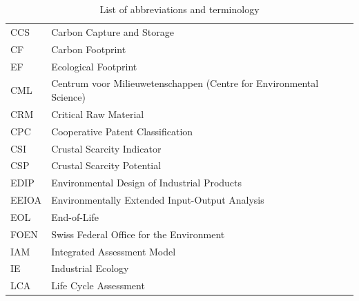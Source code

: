 \documentclass[a4paper,fleqn,longmktitle]{cas-dc}
\begin{document}

\maketitle

\begin{table}[H]
  \centering
  \caption*{List of abbreviations and terminology}\label{tab:abbreviations}
  \begin{tabular}{ll}
      \toprule
      CCS              & Carbon Capture and Storage                                           \\
      CF                & Carbon Footprint                                                    \\
      EF                & Ecological Footprint                                                \\
      CML               & Centrum voor Milieuwetenschappen (Centre for Environmental Science) \\
      CRM               & Critical Raw Material                                               \\
      CPC               & Cooperative Patent Classification                                   \\
      CSI               & Crustal Scarcity Indicator                                          \\
      CSP               & Crustal Scarcity Potential                                          \\
      EDIP              & Environmental Design of Industrial Products                         \\
      EEIOA             & Environmentally Extended Input-Output Analysis                      \\
      EOL               & End-of-Life                                                         \\
      FOEN              & Swiss Federal Office for the Environment                            \\
      IAM               & Integrated Assessment Model                                         \\
      IE                & Industrial Ecology                                                  \\
      LCA               & Life Cycle Assessment                                               \\

\end{tabular}
\end{table}
\end{document}
